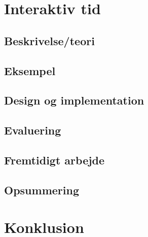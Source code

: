 \chapter{Interaktiv tid}
  \section{Beskrivelse/teori}
  \section{Eksempel}
  \section{Design og implementation}
  \section{Evaluering}
  \section{Fremtidigt arbejde}
  \section{Opsummering}
\chapter{Konklusion}

\newpage
\backmatter


\linespread{1}
\printbibliography



